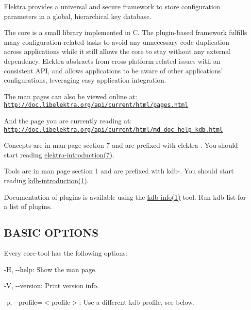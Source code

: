 Elektra provides a universal and secure framework to store configuration parameters in a global, hierarchical key database.

The core is a small library implemented in C. The plugin-\/based framework fulfills many configuration-\/related tasks to avoid any unnecessary code duplication across applications while it still allows the core to stay without any external dependency. Elektra abstracts from cross-\/platform-\/related issues with an consistent A\+P\+I, and allows applications to be aware of other applications' configurations, leveraging easy application integration.

The man pages can also be viewed online at\+: \href{http://doc.libelektra.org/api/current/html/pages.html}{\tt http\+://doc.\+libelektra.\+org/api/current/html/pages.\+html}

And the page you are currently reading at\+: \href{http://doc.libelektra.org/api/current/html/md_doc_help_kdb.html}{\tt http\+://doc.\+libelektra.\+org/api/current/html/md\+\_\+doc\+\_\+help\+\_\+kdb.\+html}

Concepts are in man page section 7 and are prefixed with {\ttfamily elektra-\/}. You should start reading \hyperlink{md_doc_help_elektra-introduction_doc_help_elektra-introduction_md}{elektra-\/introduction(7)}.

Tools are in man page section 1 and are prefixed with {\ttfamily kdb-\/}. You should start reading \hyperlink{md_doc_help_kdb-introduction_doc_help_kdb-introduction_md}{kdb-\/introduction(1)}.

Documentation of plugins is available using the \hyperlink{md_doc_help_kdb-info_doc_help_kdb-info_md}{kdb-\/info(1)} tool. Run {\ttfamily kdb list} for a list of plugins.

\subsection*{B\+A\+S\+I\+C O\+P\+T\+I\+O\+N\+S}

Every core-\/tool has the following options\+:


\begin{DoxyItemize}
\item {\ttfamily -\/\+H}, {\ttfamily -\/-\/help}\+: Show the man page.
\item {\ttfamily -\/\+V}, {\ttfamily -\/-\/version}\+: Print version info.
\item {\ttfamily -\/p}, {\ttfamily -\/-\/profile}=$<$profile$>$\+: Use a different kdb profile, see below.
\end{DoxyItemize}

